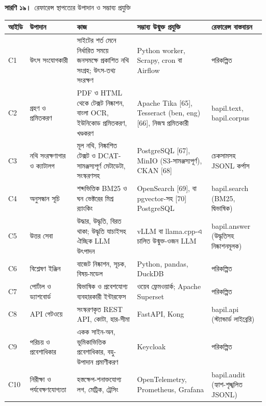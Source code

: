 \documentclass[border=10pt]{standalone}
\begin{document}
\begin{minipage}{17cm}
{\large\bfseries সারণি ১৯।}\ {\large রেফারেন্স স্থাপত্যের উপাদান ও সম্ভাব্য প্রযুক্তি}\par\vspace{7pt}
\small
{}
\begin{tabularx}{\linewidth}{@{}>{\hsize=0.309\hsize\raggedright\arraybackslash}X>{\hsize=0.979\hsize\raggedright\arraybackslash}X>{\hsize=1.546\hsize\raggedright\arraybackslash}X>{\hsize=1.340\hsize\raggedright\arraybackslash}X>{\hsize=0.825\hsize\raggedright\arraybackslash}X@{}}
\arrayrulecolor{bapilrule}\toprule
\rowcolor{white}\textbf{আইডি} & \textbf{উপাদান} & \textbf{কাজ} & \textbf{সম্ভাব্য উন্মুক্ত প্রযুক্তি} & \textbf{রেফারেন্স বাস্তবায়ন} \\
\midrule
C1 & উৎস সংযোগকারী & সাইটের শর্ত মেনে নির্ধারিত সময়ে জনসমক্ষে প্রকাশিত নথি সংগ্রহ; উৎস-তথ্য সংরক্ষণ & Python worker, Scrapy, cron বা Airflow & পরিকল্পিত \\
C2 & গ্রহণ ও প্রমিতকরণ & PDF ও HTML থেকে টেক্সট নিষ্কাশন, বাংলা OCR, ইউনিকোড প্রমিতকরণ, খণ্ডকরণ & Apache Tika [65], Tesseract (ben, eng) [66], নিজস্ব প্রমিতকারী & bapil.text, bapil.corpus \\
C3 & নথি সংরক্ষণাগার ও ক্যাটালগ & মূল নথি, নিষ্কাশিত টেক্সট ও DCAT-সামঞ্জস্যপূর্ণ মেটাডেটা, সংস্করণসহ & PostgreSQL [67], MinIO (S3-সামঞ্জস্যপূর্ণ), CKAN [68] & চেকসামসহ JSONL কর্পাস \\
C4 & অনুসন্ধান সূচি & শব্দভিত্তিক BM25 ও ঘন ভেক্টরের মিশ্র র‍্যাংকিং & OpenSearch [69], বা pgvector-সহ [70] PostgreSQL & bapil.search (BM25, দ্বিভাষিক) \\
C5 & উত্তর সেবা & উদ্ধার, উদ্ধৃতি, বিরত থাকা; উদ্ধৃতি যাচাইসহ ঐচ্ছিক LLM উৎপাদন & vLLM বা llama.cpp-এ চালিত উন্মুক্ত-ওজন LLM & bapil.answer (উদ্ধৃতিসহ নিষ্কাশনমূলক) \\
C6 & বিশ্লেষণ ইঞ্জিন & বাজেট নিষ্কাশন, সূচক, বিষয়-মডেল & Python, pandas, DuckDB & পরিকল্পিত \\
C7 & পোর্টাল ও ড্যাশবোর্ড & দ্বিভাষিক ও প্রবেশযোগ্য ব্যবহারকারী ইন্টারফেস & ওয়েব ফ্রেমওয়ার্ক; Apache Superset & পরিকল্পিত \\
C8 & API গেটওয়ে & সংস্করণকৃত REST API, কোটা, হার-সীমা & FastAPI, Kong & bapil.api (স্ট্যান্ডার্ড লাইব্রেরি) \\
C9 & পরিচয় ও প্রবেশাধিকার & একক সাইন-অন, ভূমিকাভিত্তিক প্রবেশাধিকার, বহু-উপাদান প্রমাণীকরণ & Keycloak & পরিকল্পিত \\
C10 & নিরীক্ষা ও পর্যবেক্ষণযোগ্যতা & হস্তক্ষেপ-শনাক্তযোগ্য লগ, মেট্রিক, ট্রেসিং & OpenTelemetry, Prometheus, Grafana & bapil.audit (হ্যাশ-শৃঙ্খলিত JSONL) \\

\end{tabularx}
\end{minipage}
\end{document}
